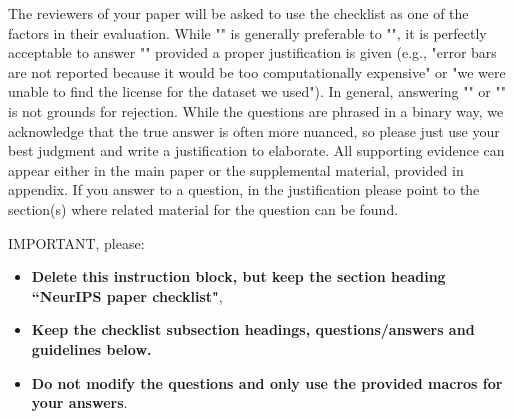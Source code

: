\documentclass{article} %
\newcounter{ct}
\theoremstyle{definition}
\theoremstyle{remark}
\begin{document}
The reviewers of your paper will be asked to use the checklist as one of the factors in their evaluation. While "\answerYes{}" is generally preferable to "\answerNo{}", it is perfectly acceptable to answer "\answerNo{}" provided a proper justification is given (e.g., "error bars are not reported because it would be too computationally expensive" or "we were unable to find the license for the dataset we used"). In general, answering "\answerNo{}" or "\answerNA{}" is not grounds for rejection. While the questions are phrased in a binary way, we acknowledge that the true answer is often more nuanced, so please just use your best judgment and write a justification to elaborate. All supporting evidence can appear either in the main paper or the supplemental material, provided in appendix. If you answer \answerYes{} to a question, in the justification please point to the section(s) where related material for the question can be found.

IMPORTANT, please:
\begin{itemize}
    \item {\bf Delete this instruction block, but keep the section heading ``NeurIPS paper checklist"},
    \item  {\bf Keep the checklist subsection headings, questions/answers and guidelines below.}
    \item {\bf Do not modify the questions and only use the provided macros for your answers}.
\end{itemize} 
 

\end{document}
